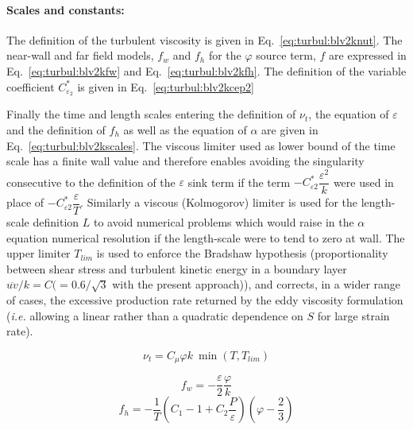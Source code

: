 \paragraph{Scales and constants:}

The definition of the turbulent viscosity is given in Eq.~\eqref{eq:turbul:blv2knut}.
The near-wall and far field models, $f_w$ and $f_h$ for the $\varphi$ source term, $f$ are
expressed in Eq.~\eqref{eq:turbul:blv2kfw} and Eq.~\eqref{eq:turbul:blv2kfh}.
The definition of the variable coefficient $C_{\varepsilon_2}^*$ is given in Eq.~\eqref{eq:turbul:blv2kcep2}

Finally the time and length scales entering the definition of $\nu_t$, the equation of
$\varepsilon$ and the definition of $f_h$ as well as the equation of $\alpha$ are given in
Eq.~\eqref{eq:turbul:blv2kscales}. The viscous limiter used as lower bound of the time scale
has a finite wall value and therefore enables avoiding the singularity consecutive to the definition
of the $\varepsilon$ sink term if the term $-C_{\varepsilon 2}^* \dfrac{\varepsilon^2}{k}$ were
used in place of $-C_{\varepsilon 2}^* \dfrac{\varepsilon}{T}$.
Similarly a viscous (Kolmogorov) limiter is used for the length-scale definition $L$ to
avoid numerical problems which would raise in the $\alpha$ equation numerical resolution
if the length-scale were to tend to zero at wall. The upper limiter $T_{lim}$ is used to
enforce the Bradshaw hypothesis (proportionality between shear stress and turbulent
kinetic energy in a boundary layer $\overline{uv}/k=C (=0.6/\sqrt{3}$ with the present approach)),
and corrects, in a wider range of cases, the excessive production rate returned by
the eddy viscosity formulation (\emph{i.e.} allowing a linear rather than a quadratic
dependence on $S$ for large strain rate).

\begin{equation}
	\nu_t= C_\mu \varphi k ~ \min(T,T_{lim})
\label{eq:turbul:blv2knut}
\end{equation}

\begin{equation}
f_w = - \dfrac{\varepsilon}{2} \dfrac{\varphi}{k}
\label{eq:turbul:blv2kfw}
\end{equation}
\begin{equation}
f_h = - \dfrac{1}{T} \left(  C_1 -1 +C_2 \dfrac{P}{\varepsilon}   \right) \left(  \varphi - \dfrac{2}{3}  \right)
\label{eq:turbul:blv2kfh}
\end{equation}


